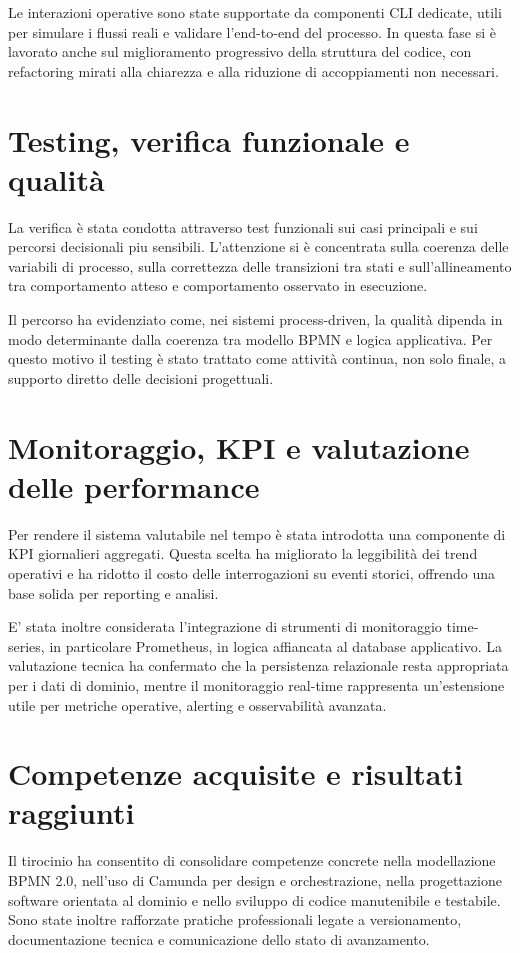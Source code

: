 \documentclass[12pt,a4paper]{article}
\begin{document}
Le interazioni operative sono state supportate da componenti CLI dedicate, utili per simulare i flussi reali e validare l'end-to-end del processo. In questa fase si è lavorato anche sul miglioramento progressivo della struttura del codice, con refactoring mirati alla chiarezza e alla riduzione di accoppiamenti non necessari.

\section{Testing, verifica funzionale e qualità}

La verifica è stata condotta attraverso test funzionali sui casi principali e sui percorsi decisionali piu sensibili. L'attenzione si è concentrata sulla coerenza delle variabili di processo, sulla correttezza delle transizioni tra stati e sull'allineamento tra comportamento atteso e comportamento osservato in esecuzione.

Il percorso ha evidenziato come, nei sistemi process-driven, la qualità dipenda in modo determinante dalla coerenza tra modello BPMN e logica applicativa. Per questo motivo il testing è stato trattato come attività continua, non solo finale, a supporto diretto delle decisioni progettuali.

\section{Monitoraggio, KPI e valutazione delle performance}

Per rendere il sistema valutabile nel tempo è stata introdotta una componente di KPI giornalieri aggregati. Questa scelta ha migliorato la leggibilità dei trend operativi e ha ridotto il costo delle interrogazioni su eventi storici, offrendo una base solida per reporting e analisi.

E' stata inoltre considerata l'integrazione di strumenti di monitoraggio time-series, in particolare Prometheus, in logica affiancata al database applicativo. La valutazione tecnica ha confermato che la persistenza relazionale resta appropriata per i dati di dominio, mentre il monitoraggio real-time rappresenta un'estensione utile per metriche operative, alerting e osservabilità avanzata.

\section{Competenze acquisite e risultati raggiunti}

Il tirocinio ha consentito di consolidare competenze concrete nella modellazione BPMN 2.0, nell'uso di Camunda per design e orchestrazione, nella progettazione software orientata al dominio e nello sviluppo di codice manutenibile e testabile. Sono state inoltre rafforzate pratiche professionali legate a versionamento, documentazione tecnica e comunicazione dello stato di avanzamento.
\end{document}
